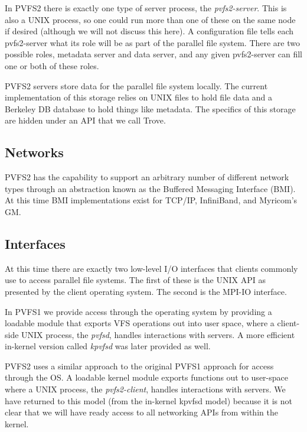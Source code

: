 In PVFS2 there is exactly one type of server process, the \emph{pvfs2-server}.
This is also a UNIX process, so one could run more than one of these on the
same node if desired (although we will not discuss this here).  A
configuration file tells each pvfs2-server what its role will be as part of
the parallel file system.  There are two possible roles, metadata server and
data server, and any given pvfs2-server can fill one or both of these roles.

PVFS2 servers store data for the parallel file system locally.  The current
implementation of this storage relies on UNIX files to hold file data and a
Berkeley DB database to hold things like metadata.  The specifics of this
storage are hidden under an API that we call Trove.

\subsection{Networks}

PVFS2 has the capability to support an arbitrary number of different network
types through an abstraction known as the Buffered Messaging Interface (BMI).
At this time BMI implementations exist for TCP/IP, InfiniBand, and Myricom's
GM.

\subsection{Interfaces}

At this time there are exactly two low-level I/O interfaces that clients
commonly use to access parallel file systems.  The first of these is the UNIX
API as presented by the client operating system.  The second is the MPI-IO
interface.

In PVFS1 we provide access through the operating system by providing a
loadable module that exports VFS operations out into user space, where a
client-side UNIX process, the \emph{pvfsd}, handles interactions with servers.
A more efficient in-kernel version called \emph{kpvfsd} was later provided as
well.

PVFS2 uses a similar approach to the original PVFS1 approach for access
through the OS.  A loadable kernel module exports functions out to user-space
where a UNIX process, the \emph{pvfs2-client}, handles interactions with
servers.  We have returned to this model (from the in-kernel kpvfsd model)
because it is not clear that we will have ready access to all networking APIs
from within the kernel.

